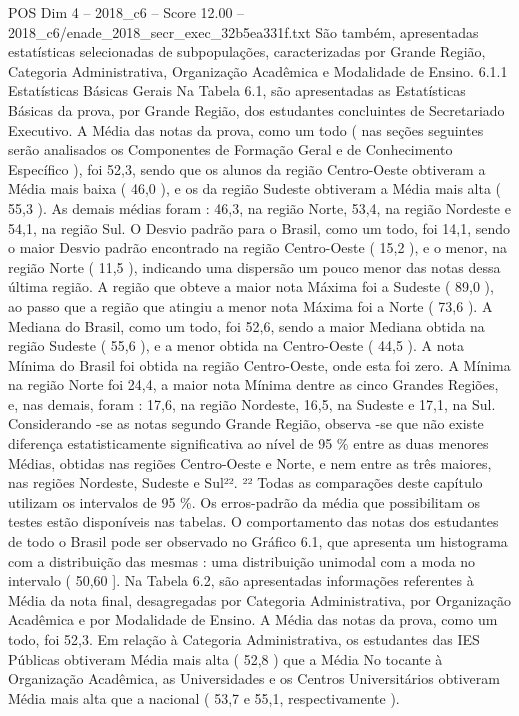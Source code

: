 \begin{textsample}{POS Dim 4 – 2018\_c6 – Score 12.00 – 2018\_c6/enade\_2018\_secr\_exec\_32b5ea331f.txt}
São também, apresentadas estatísticas selecionadas de subpopulações, caracterizadas por Grande Região, Categoria Administrativa, Organização Acadêmica e Modalidade de Ensino. 6.1.1 Estatísticas Básicas Gerais Na Tabela 6.1, são apresentadas as Estatísticas Básicas da prova, por Grande Região, dos estudantes concluintes de Secretariado Executivo.
A Média das notas da prova, como um todo ( nas seções seguintes serão analisados os Componentes de Formação Geral e de Conhecimento Específico ), foi 52,3, sendo que os alunos da região Centro-Oeste obtiveram a Média mais baixa ( 46,0 ), e os da região Sudeste obtiveram a Média mais alta ( 55,3 ).
As demais médias foram : 46,3, na região Norte, 53,4, na região Nordeste e 54,1, na região Sul.
O Desvio padrão para o Brasil, como um todo, foi 14,1, sendo o maior Desvio padrão encontrado na região Centro-Oeste ( 15,2 ), e o menor, na região Norte ( 11,5 ), indicando uma dispersão um pouco menor das notas dessa última região.
A região que obteve a maior nota Máxima foi a Sudeste ( 89,0 ), ao passo que a região que atingiu a menor nota Máxima foi a Norte ( 73,6 ).
A Mediana do Brasil, como um todo, foi 52,6, sendo a maior Mediana obtida na região Sudeste ( 55,6 ), e a menor obtida na Centro-Oeste ( 44,5 ).
A nota Mínima do Brasil foi obtida na região Centro-Oeste, onde esta foi zero.
A Mínima na região Norte foi 24,4, a maior nota Mínima dentre as cinco Grandes Regiões, e, nas demais, foram : 17,6, na região Nordeste, 16,5, na Sudeste e 17,1, na Sul.
Considerando -se as notas segundo Grande Região, observa -se que não existe diferença estatisticamente significativa ao nível de 95 \% entre as duas menores Médias, obtidas nas regiões Centro-Oeste e Norte, e nem entre as três maiores, nas regiões Nordeste, Sudeste e Sul²². ²² Todas as comparações deste capítulo utilizam os intervalos de 95 \%.
Os erros-padrão da média que possibilitam os testes estão disponíveis nas tabelas.
O comportamento das notas dos estudantes de todo o Brasil pode ser observado no Gráfico 6.1, que apresenta um histograma com a distribuição das mesmas : uma distribuição unimodal com a moda no intervalo ( 50,60 ].
Na Tabela 6.2, são apresentadas informações referentes à Média da nota final, desagregadas por Categoria Administrativa, por Organização Acadêmica e por Modalidade de Ensino.
A Média das notas da prova, como um todo, foi 52,3.
Em relação à Categoria Administrativa, os estudantes das IES Públicas obtiveram Média mais alta ( 52,8 ) que a Média No tocante à Organização Acadêmica, as Universidades e os Centros Universitários obtiveram Média mais alta que a nacional ( 53,7 e 55,1, respectivamente ).

\end{textsample}
